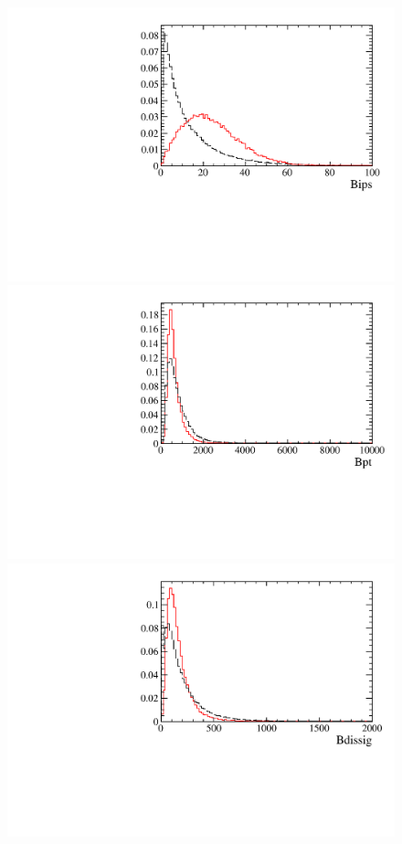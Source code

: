 \begin{figure} [htb!]
\begin{center}
\includegraphics[scale=0.20]{figs/BipsPARTIAL.pdf}
\includegraphics[scale=0.20]{figs/BptPARTIAL.pdf}
\includegraphics[scale=0.20]{figs/BdissigPARTIAL.pdf}

\end{center}
\end{figure}
